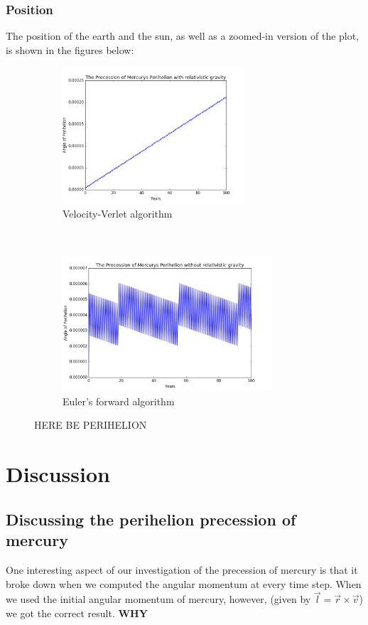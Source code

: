 \documentclass[a4paper, 10pt]{article}
\begin{document}
\subsubsection{Position}
The position of the earth and the sun, as well as a zoomed-in version of the plot, is shown in the figures below:
\begin{figure}[t!]
    \centering
    \begin{subfigure}[t]{0.5\textwidth}
        \centering
        \includegraphics[height=2.0in]{angle.png}
        \caption{Velocity-Verlet algorithm}
    \end{subfigure}%
    ~ 
    \begin{subfigure}[t]{0.5\textwidth}
        \centering
        \includegraphics[height=2.0in]{angleNoRel2.png}
        \caption{Euler's forward algorithm}
    \end{subfigure}
    \caption{HERE BE PERIHELION}
\end{figure}
\section{Discussion}
\subsection{Discussing the perihelion precession of mercury}
One interesting aspect of our investigation of the precession of mercury is that it broke down when we computed the angular momentum at every time step. When we used the initial angular momentum of mercury, however, (given by $\vec{l}=\vec{r}\times \vec{v}$) we got the correct result. \textbf{WHY}
\end{document}
